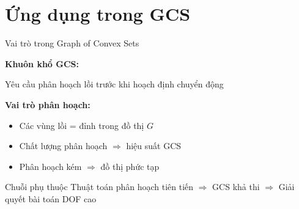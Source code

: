 \documentclass[aspectratio=169]{beamer}
\begin{document}
\section{Ứng dụng trong GCS}

\begin{frame}{Vai trò trong Graph of Convex Sets}

    \textbf{Khuôn khổ GCS:}
    
    Yêu cầu phân hoạch lồi trước khi hoạch định chuyển động

    \vspace{1em}
    \textbf{Vai trò phân hoạch:}
    \begin{itemize}
        \item Các vùng lồi = đỉnh trong đồ thị $G$
        \item Chất lượng phân hoạch $\Rightarrow$ hiệu suất GCS
        \item Phân hoạch kém $\Rightarrow$ đồ thị phức tạp
    \end{itemize}

    \vspace{0.5em}
    \begin{alertblock}{Chuỗi phụ thuộc}
        Thuật toán phân hoạch tiên tiến $\Rightarrow$ GCS khả thi $\Rightarrow$ Giải quyết bài toán DOF cao
    \end{alertblock}

\end{frame}
\end{document}
